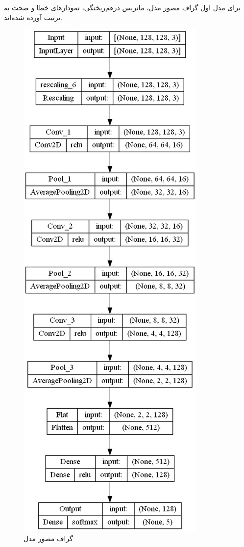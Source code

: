 \documentclass{article}
\begin{document}
\cleardoublepage


برای مدل اول گراف مصور مدل، ماتریس درهم‌ریختگی، نمودارهای خطا و صحت به ترتیب آورده شده‌اند.

\begin{figure}[!h]
    \centering\includegraphics[scale=.45]{./p1-11}
    \caption{گراف مصور مدل}\label{fig.111}
\end{figure}
\end{document}
